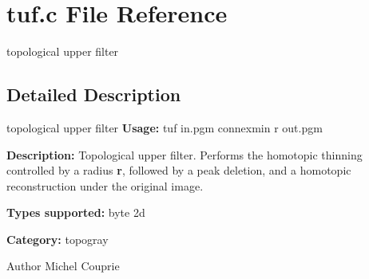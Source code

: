 \section{tuf.c File Reference}
\label{tuf_8c}


topological upper filter  




\subsection{Detailed Description}
topological upper filter {\bfseries Usage:} tuf in.pgm connexmin r out.pgm

{\bfseries Description:} Topological upper filter. Performs the homotopic thinning controlled by a radius {\bfseries r}, followed by a peak deletion, and a homotopic reconstruction under the original image.

{\bfseries Types supported:} byte 2d

{\bfseries Category:} topogray

\begin{DoxyAuthor}{Author}
Michel Couprie 
\end{DoxyAuthor}
